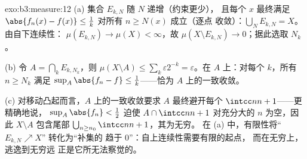 \begin{solution}{exo:b3:measure:12}
(a) 集合 $E_{k,N}$ 随 $N$ 递增（约束更少），
且每个 $x$ 最终满足 $\abs{f_n(x)
- f(x)} \leq \frac1k$ 对所有 $n \geq N(x)$ 成立（逐点
收敛）：$\bigcup_NE_{k,N} = X$。由自下连续性：
$\mu(E_{k,N}) \to \mu(X) < \infty$，故 $\mu(X\setminus
E_{k,N}) \to 0$；据此选取 $N_k$。

(b) 令 $A = \bigcap_kE_{k,N_k}$，则 $\mu(X\setminus A) \leq
\sum_k\varepsilon2^{-k} = \varepsilon$。在 $A$ 上：对每个
$k$，所有 $n \geq N_k$ 满足 $\sup_A\abs{f_n - f} \leq
\frac1k$——恰为 $A$ 上的一致收敛。

(c) 对移动凸起而言，$A$ 上的一致收敛要求
$A$ 最终避开每个 $\intcc n{n+1}$——更精确地说，
$\sup_A\abs{f_n} < \frac12$ 迫使 $A \cap \intcc
n{n+1}$ 对充分大的 $n$ 为空，因此 $X \setminus A$
包含尾部 $\bigcup_{n\geq n_0}\intcc n{n+1}$，其为无穷。
在 (a) 中，有限性将“$E_{k,N}\nearrow X$”
转化为“补集的
趋于 $0$”：自上连续性需要有限的起点，
而在无穷上，逃逸到无穷远
正是它所无法察觉的。
\end{solution}

